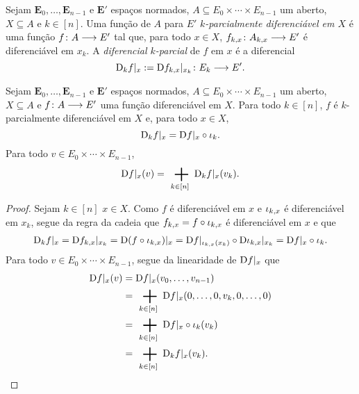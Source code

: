 \begin{definition}
Sejam $\bm E_0, \ldots, \bm E_{n-1}$ e $\bm E'$ espaços normados, $A \subseteq E_0 \times \cdots \times E_{n-1}$ um aberto, $X \subseteq A$ e $k \in [n]$. Uma função de $A$ para $E'$ \emph{$k$-parcialmente diferenciável em $X$} é uma função ${f}\colon {A} \longrightarrow {E'}$ tal que, para todo $x \in X$, ${f_{k,x}}\colon {A_{k,x}} \longrightarrow {E'}$ é diferenciável em $x_k$. A \emph{diferencial $k$-parcial} de $f$ em $x$ é a diferencial
	\begin{equation*}
	\mathrm{D}_k f|_x := {\mathrm{D} f_{k,x}|_{x_k}}\colon {E_k} \longrightarrow {E'}.
	\end{equation*}
\end{definition}

\begin{proposition}
\label{prop:diferenciabilidade.diferenciabilidade.parcial}
Sejam $\bm E_0, \ldots, \bm E_{n-1}$ e $\bm E'$ espaços normados, $A \subseteq E_0 \times \cdots \times E_{n-1}$ um aberto, $X \subseteq A$ e ${f}\colon {A} \longrightarrow {E'}$ uma função diferenciável em $X$. Para todo $k \in [n]$, $f$ é $k$-parcialmente diferenciável em $X$ e, para todo $x \in X$,
	\begin{equation*}
	\mathrm{D}_k f|_x = \mathrm{D} f|_x \circ \iota_k.
	\end{equation*}
Para todo $v \in E_0 \times \cdots \times E_{n-1}$,
	\begin{equation*}
	\D f|_x(v) = \sum_{k \in [n]} \D_k f|_x(v_k).
	\end{equation*}
\end{proposition}
\begin{proof}
Sejam $k \in [n]$ $x \in X$. Como $f$ é diferenciável em $x$ e $\iota_{k,x}$ é diferenciável em $x_k$, segue da regra da cadeia que $f_{k,x} = f \circ \iota_{k,x}$ é diferenciável em $x$ e que
	\begin{align*}
	\mathrm{D}_k f|_x = \mathrm{D} f_{k,x}|_{x_k} = \mathrm{D} (f \circ \iota_{k,x})|_x = \mathrm{D} f|_{\iota_{k,x}(x_k)} \circ \mathrm{D} \iota_{k,x}|_{x_k} = \mathrm{D} f|_x \circ \iota_k.
	\end{align*}
Para todo $v \in E_0 \times \cdots \times E_{n-1}$, segue da linearidade de $\mathrm{D} f|_x$ que
	\begin{align*}
	\D f|_x(v) &= \D f|_x(v_0,\ldots,v_{n-1}) \\
		&= \sum_{k \in [n]} \D f|_x(0,\ldots,0,v_k,0,\ldots,0) \\
		&= \sum_{k \in [n]} \D f|_x \circ \inclu_k(v_k) \\
		&= \sum_{k \in [n]} \D_k f|_x(v_k).
		\qedhere
	\end{align*}
\end{proof}

